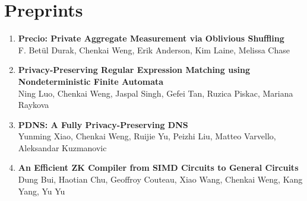 \documentclass[letterpaper,11pt]{article}
\makeatletter
\newcommand{\resumeItem}[1]{
  \item\small{
    {#1 \vspace{-2pt}}
  }
}
\newcommand{\resumeProjectHeading}[2]{
    \item
    \begin{tabular*}{0.97\textwidth}{l@{\extracolsep{\fill}}r}
      \small#1 & #2 \\
    \end{tabular*}\vspace{-7pt}
}
\newcommand{\resumeSubHeadingListStart}{\begin{itemize}[leftmargin=0.15in, label={}]}
\newcommand{\resumeSubHeadingListEnd}{\end{itemize}}
\newcommand{\resumeItemListStart}{\begin{itemize}}
\newcommand{\resumeItemListEnd}{\end{itemize}\vspace{-5pt}}
\makeatother
\begin{document}

\section{Preprints}
\begin{enumerate}[leftmargin=0.20in]
  \item
    {\textbf{\small Precio: Private Aggregate Measurement via Oblivious Shuffling}} \\
		{\small F. Betül Durak, Chenkai Weng, Erik Anderson, Kim Laine, Melissa Chase \vspace{-2pt}}
  \item 
    {\textbf{\small Privacy-Preserving Regular Expression Matching using Nondeterministic Finite Automata}} \\
		{\small Ning Luo, Chenkai Weng, Jaspal Singh, Gefei Tan, Ruzica Piskac, Mariana Raykova \vspace{-2pt}}
  \item 
    {\textbf{\small PDNS: A Fully Privacy-Preserving DNS}} \\
		{\small Yunming Xiao, Chenkai Weng, Ruijie Yu, Peizhi Liu, Matteo Varvello, Aleksandar Kuzmanovic \vspace{-2pt}}
  \item 
    {\textbf{\small An Efficient ZK Compiler from SIMD Circuits to General Circuits}} \\
		{\small Dung Bui, Haotian Chu, Geoffroy Couteau, Xiao Wang, Chenkai Weng, Kang Yang, Yu Yu \vspace{-2pt}}


\end{enumerate}
\end{document}
